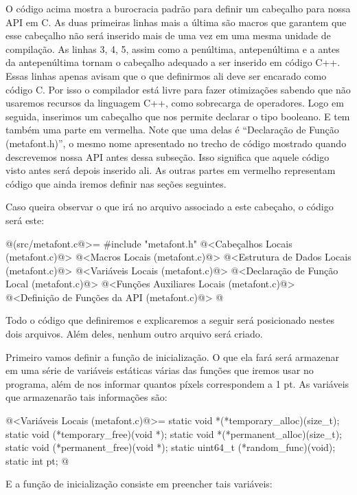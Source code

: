 O código acima mostra a burocracia padrão para definir um cabeçalho
para nossa API em C. As duas primeiras linhas mais a última são macros
que garantem que esse cabeçalho não será inserido mais de uma vez em
uma mesma unidade de compilação. As linhas 3, 4, 5, assim como a
penúltima, antepenúltima e a antes da antepenúltima tornam o cabeçalho
adequado a ser inserido em código C++. Essas linhas apenas avisam que
o que definirmos ali deve ser encarado como código C. Por isso o
compilador está livre para fazer otimizações sabendo que não usaremos
recursos da linguagem C++, como sobrecarga de operadores. Logo em
seguida, inserimos um cabeçalho que nos permite declarar o tipo
booleano. E tem também uma parte em vermelha. Note que uma delas é
``Declaração de Função (metafont.h)'', o mesmo nome apresentado no
trecho de código mostrado quando descrevemos nossa API antes dessa
subseção. Isso significa que aquele código visto antes será depois
inserido ali. As outras partes em vermelho representam código que
ainda iremos definir nas seções seguintes.

Caso queira observar o que irá no arquivo 
associado a este cabeçaho, o código será este:

\iniciocodigo
@(src/metafont.c@>=
#include "metafont.h"
@<Cabeçalhos Locais (metafont.c)@>
@<Macros Locais (metafont.c)@>
@<Estrutura de Dados Locais (metafont.c)@>
@<Variáveis Locais (metafont.c)@>
@<Declaração de Função Local (metafont.c)@>
@<Funções Auxiliares Locais (metafont.c)@>
@<Definição de Funções da API (metafont.c)@>
@
\fimcodigo

Todo o código que definiremos e explicaremos a seguir será posicionado
nestes dois arquivos. Além deles, nenhum outro arquivo será criado.


Primeiro vamos definir a função de inicialização. O que ela fará será
armazenar em uma série de variáveis estáticas várias das funções que
iremos usar no programa, além de nos informar quantos píxels
correspondem a 1 pt. As variáveis que armazenarão tais informações são:

\iniciocodigo
@<Variáveis Locais (metafont.c)@>=
static void *(*temporary_alloc)(size_t);
static void (*temporary_free)(void *);
static void *(*permanent_alloc)(size_t);
static void (*permanent_free)(void *);
static uint64_t (*random_func)(void);
static int pt;
@
\fimcodigo

E a função de inicialização consiste em preencher tais variáveis:

